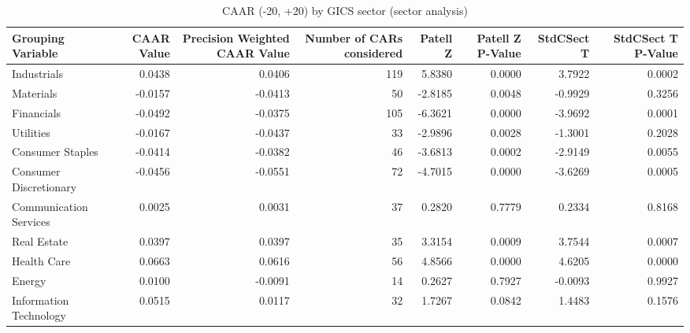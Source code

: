\begin{table}
\caption{CAAR (-20, +20) by GICS sector (sector analysis)}
\label{tab:sector_caar}
\begin{tabular}{lrrrrrrr}
\toprule
Grouping Variable & CAAR Value & Precision Weighted CAAR Value & Number of CARs considered & Patell Z & Patell Z P-Value & StdCSect T & StdCSect T P-Value \\
\midrule
Industrials & 0.0438 & 0.0406 & 119 & 5.8380 & 0.0000 & 3.7922 & 0.0002 \\
Materials & -0.0157 & -0.0413 & 50 & -2.8185 & 0.0048 & -0.9929 & 0.3256 \\
Financials & -0.0492 & -0.0375 & 105 & -6.3621 & 0.0000 & -3.9692 & 0.0001 \\
Utilities & -0.0167 & -0.0437 & 33 & -2.9896 & 0.0028 & -1.3001 & 0.2028 \\
Consumer Staples & -0.0414 & -0.0382 & 46 & -3.6813 & 0.0002 & -2.9149 & 0.0055 \\
Consumer Discretionary & -0.0456 & -0.0551 & 72 & -4.7015 & 0.0000 & -3.6269 & 0.0005 \\
Communication Services & 0.0025 & 0.0031 & 37 & 0.2820 & 0.7779 & 0.2334 & 0.8168 \\
Real Estate & 0.0397 & 0.0397 & 35 & 3.3154 & 0.0009 & 3.7544 & 0.0007 \\
Health Care & 0.0663 & 0.0616 & 56 & 4.8566 & 0.0000 & 4.6205 & 0.0000 \\
Energy & 0.0100 & -0.0091 & 14 & 0.2627 & 0.7927 & -0.0093 & 0.9927 \\
Information Technology & 0.0515 & 0.0117 & 32 & 1.7267 & 0.0842 & 1.4483 & 0.1576 \\
\bottomrule
\end{tabular}
\end{table}
